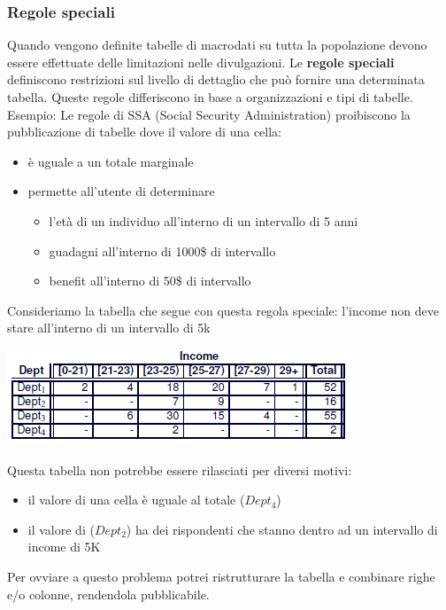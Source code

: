 \subsubsection{Regole speciali}
Quando vengono definite tabelle di macrodati su tutta la popolazione devono essere effettuate delle limitazioni nelle divulgazioni. Le \textbf{regole speciali} definiscono restrizioni sul livello di dettaglio che può fornire una determinata tabella. Queste regole differiscono in base a organizzazioni e tipi di tabelle.\\
Esempio: Le regole di SSA (Social Security Administration) proibiscono la pubblicazione di tabelle dove il valore di una cella:
\begin{itemize}
    \item è uguale a un totale marginale
    \item permette all'utente di determinare
    \begin{itemize}
        \item l'età di un individuo all'interno di un intervallo di 5 anni
        \item guadagni all'interno di 1000\$ di intervallo
        \item benefit all'interno di 50\$ di intervallo
    \end{itemize}
\end{itemize}
Consideriamo la tabella che segue con questa regola speciale: l'income non deve stare all'interno di un intervallo di 5k
\begin{center}
    \includegraphics[scale=0.7]{img/sprules.png}
\end{center}
Questa tabella non potrebbe essere rilasciati per diversi motivi:
\begin{itemize}
    \item il valore di una cella è uguale al totale (\(Dept_4\))
    \item il valore di (\(Dept_2\)) ha dei rispondenti che stanno dentro ad un intervallo di income di 5K
\end{itemize}
Per ovviare a questo problema potrei ristrutturare la tabella e combinare righe e/o colonne, rendendola pubblicabile.

